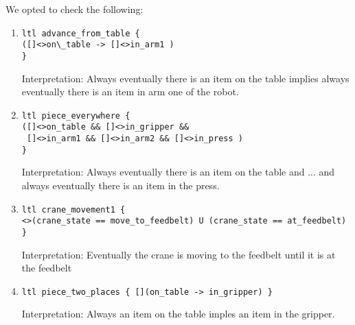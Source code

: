 \documentclass[12pt]{article}
\begin{document}
We opted to check the following:
\begin{enumerate}
\item
\begin{verbatim}
ltl advance_from_table { 
([]<>on\_table -> []<>in_arm1 )
}
\end{verbatim}
Interpretation: Always eventually there is an item on the table implies
always eventually there is an item in arm one of the robot.
\item
\begin{verbatim}
ltl piece_everywhere { 
([]<>on_table && []<>in_gripper && 
 []<>in_arm1 && []<>in_arm2 && []<>in_press )
}
\end{verbatim}
Interpretation: Always eventually there is an item on the table and ... and always eventually there is an item in the press.
\item
\begin{verbatim}
ltl crane_movement1 { 
<>(crane_state == move_to_feedbelt) U (crane_state == at_feedbelt) 
} 
\end{verbatim}
Interpretation: Eventually the crane is moving to the feedbelt until it is at the feedbelt
\item
\begin{verbatim}
ltl piece_two_places { [](on_table -> in_gripper) }
\end{verbatim}
Interpretation: Always an item on the table imples an item in the gripper.
\end{enumerate}
\end{document}
